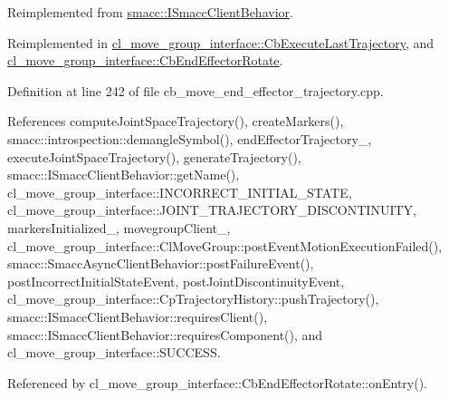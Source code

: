 Reimplemented from \hyperlink{classsmacc_1_1ISmaccClientBehavior_a3ec24a839087c550e1d62a81e48cf530}{smacc\+::\+I\+Smacc\+Client\+Behavior}.



Reimplemented in \hyperlink{classcl__move__group__interface_1_1CbExecuteLastTrajectory_ac78713663c39635ca5ac9a749503e800}{cl\+\_\+move\+\_\+group\+\_\+interface\+::\+Cb\+Execute\+Last\+Trajectory}, and \hyperlink{classcl__move__group__interface_1_1CbEndEffectorRotate_a3e60bfba48906696587d66af89f7ee2b}{cl\+\_\+move\+\_\+group\+\_\+interface\+::\+Cb\+End\+Effector\+Rotate}.



Definition at line 242 of file cb\+\_\+move\+\_\+end\+\_\+effector\+\_\+trajectory.\+cpp.



References compute\+Joint\+Space\+Trajectory(), create\+Markers(), smacc\+::introspection\+::demangle\+Symbol(), end\+Effector\+Trajectory\+\_\+, execute\+Joint\+Space\+Trajectory(), generate\+Trajectory(), smacc\+::\+I\+Smacc\+Client\+Behavior\+::get\+Name(), cl\+\_\+move\+\_\+group\+\_\+interface\+::\+I\+N\+C\+O\+R\+R\+E\+C\+T\+\_\+\+I\+N\+I\+T\+I\+A\+L\+\_\+\+S\+T\+A\+TE, cl\+\_\+move\+\_\+group\+\_\+interface\+::\+J\+O\+I\+N\+T\+\_\+\+T\+R\+A\+J\+E\+C\+T\+O\+R\+Y\+\_\+\+D\+I\+S\+C\+O\+N\+T\+I\+N\+U\+I\+TY, markers\+Initialized\+\_\+, movegroup\+Client\+\_\+, cl\+\_\+move\+\_\+group\+\_\+interface\+::\+Cl\+Move\+Group\+::post\+Event\+Motion\+Execution\+Failed(), smacc\+::\+Smacc\+Async\+Client\+Behavior\+::post\+Failure\+Event(), post\+Incorrect\+Initial\+State\+Event, post\+Joint\+Discontinuity\+Event, cl\+\_\+move\+\_\+group\+\_\+interface\+::\+Cp\+Trajectory\+History\+::push\+Trajectory(), smacc\+::\+I\+Smacc\+Client\+Behavior\+::requires\+Client(), smacc\+::\+I\+Smacc\+Client\+Behavior\+::requires\+Component(), and cl\+\_\+move\+\_\+group\+\_\+interface\+::\+S\+U\+C\+C\+E\+SS.



Referenced by cl\+\_\+move\+\_\+group\+\_\+interface\+::\+Cb\+End\+Effector\+Rotate\+::on\+Entry().


